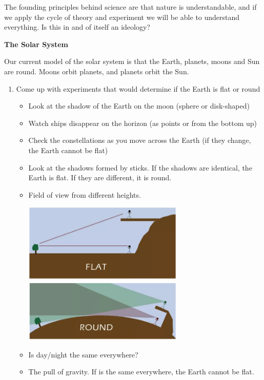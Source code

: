 \documentclass[12pt]{article}
\begin{document}
The founding principles behind science are that nature is understandable, and if we apply the cycle of theory and experiment we will be able to understand everything. Is this in and of itself an ideology?

\begin{center}\textbf{\Large The Solar System}\end{center}

Our current model of the solar system is that the Earth, planets, moons and Sun are round. Moons orbit planets, and planets orbit the Sun.

\begin{enumerate}
\item Come up with experiments that would determine if the Earth is flat or round
	\begin{itemize}
		\item Look at the shadow of the Earth on the moon (sphere or disk-shaped)
		\item Watch ships disappear on the horizon (as points or from the bottom up)
		\item Check the constellations as you move across the Earth (if they change, the Earth cannot be flat)
		\item Look at the shadows formed by sticks. If the shadows are identical, the Earth is flat. If they are different, it is round.
		\item Field of view from different heights.
		
		\includegraphics[width=3in]{../images/flat_earth_field_of_view.png}\includegraphics[width=3in]{../images/round_earth_field_of_view.png}
		
		\item Is day/night the same everywhere?
		\item The pull of gravity. If is the same everywhere, the Earth cannot be flat.
		

\end{itemize}
\end{enumerate}
\end{document}
